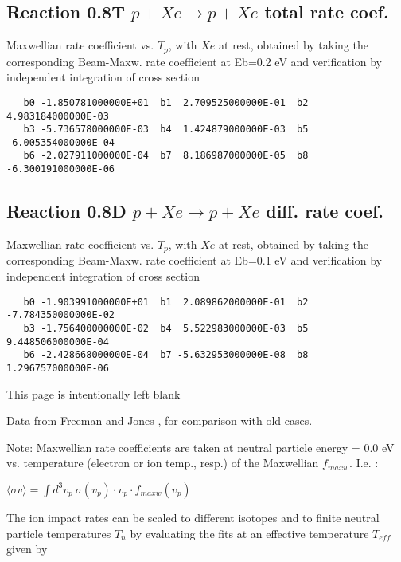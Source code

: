\documentclass[12pt,dvipdfmx]{article}
\begin{document}
\subsection{
Reaction 0.8T  $p + Xe \rightarrow p + Xe$ total rate coef.
}
Maxwellian rate coefficient vs. $T_{p}$, with $Xe$ at rest, obtained by taking
the corresponding Beam-Maxw. rate coefficient at Eb=0.2 eV and
verification by independent integration of cross section
\begin{small}\begin{verbatim}
   b0 -1.850781000000E+01  b1  2.709525000000E-01  b2  4.983184000000E-03
   b3 -5.736578000000E-03  b4  1.424879000000E-03  b5 -6.005354000000E-04
   b6 -2.027911000000E-04  b7  8.186987000000E-05  b8 -6.300191000000E-06
\end{verbatim}\end{small}


\subsection{
Reaction 0.8D  $p + Xe \rightarrow p + Xe$ diff. rate coef.
}
Maxwellian rate coefficient vs. $T_{p}$, with $Xe$ at rest, obtained by taking
the corresponding Beam-Maxw. rate coefficient at Eb=0.1 eV and
verification by independent integration of cross section
\begin{small}\begin{verbatim}
   b0 -1.903991000000E+01  b1  2.089862000000E-01  b2 -7.784350000000E-02
   b3 -1.756400000000E-02  b4  5.522983000000E-03  b5  9.448506000000E-04
   b6 -2.428668000000E-04  b7 -5.632953000000E-08  b8  1.296757000000E-06
\end{verbatim}\end{small}



\newpage
This page is intentionally left blank
\newpage


Data from Freeman and Jones \cite{kn:Freeman},
for comparison with old cases.

Note: Maxwellian rate coefficients are taken at neutral particle energy = 0.0 eV
vs. temperature (electron or ion temp., resp.) of the Maxwellian $f_{maxw}$.
I.e. :

$\langle\sigma v \rangle = \int d^3v_p \ \sigma(v_{p}) \cdot v_{p} \cdot
f_{maxw}(v_{p})$

The ion impact rates can be scaled to different isotopes and to finite
neutral particle temperatures $T_n$ by evaluating the fits at an
effective temperature $T_{eff}$ given by
\end{document}
